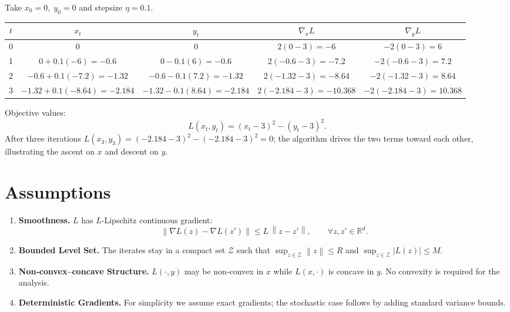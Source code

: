 \documentclass{article}
\newcommand{\norm}[1]{\left\| #1 \right\|}
\begin{document}
Take \(x_0=0,\;y_0=0\) and stepsize \(\eta=0.1\).

\begin{center}
\begin{tabular}{c|c|c|c|c}
$t$ & $x_t$ & $y_t$ & $\nabla_x L$ & $\nabla_y L$\\ \hline
0 & $0$ & $0$ & $2(0-3)=-6$ & $-2(0-3)=6$\\
1 & $0+0.1(-6)=-0.6$ & $0-0.1(6)=-0.6$ & $2(-0.6-3)=-7.2$ & $-2(-0.6-3)=7.2$\\
2 & $-0.6+0.1(-7.2)=-1.32$ & $-0.6-0.1(7.2)=-1.32$ & $2(-1.32-3)=-8.64$ & $-2(-1.32-3)=8.64$\\
3 & $-1.32+0.1(-8.64)=-2.184$ & $-1.32-0.1(8.64)=-2.184$ & $2(-2.184-3)=-10.368$ & $-2(-2.184-3)=10.368$
\end{tabular}
\end{center}
Objective values:
\[
L(x_t,y_t)=(x_t-3)^2-(y_t-3)^2.
\]
After three iterations \(L(x_3,y_3)=(-2.184-3)^2-(-2.184-3)^2=0\); the algorithm drives the two terms toward each other, illustrating the ascent on \(x\) and descent on \(y\).

\section*{Assumptions}
\begin{enumerate}[label=(A\arabic*)]
\item \textbf{Smoothness.} \(L\) has \(L\)-Lipschitz continuous gradient:
\[
\norm{\nabla L(z)-\nabla L(z')}\le L\,\norm{z-z'},\qquad
\forall z,z'\in\mathbb{R}^{d}.
\tag{A1}
\]
\item \textbf{Bounded Level Set.} The iterates stay in a compact set
\(\mathcal{Z}\) such that \(\sup_{z\in\mathcal{Z}}\norm{z}\le R\) and
\(\sup_{z\in\mathcal{Z}}|L(z)|\le M\).
\item \textbf{Non‑convex–concave Structure.} \(L(\cdot,y)\) may be non‑convex
in \(x\) while \(L(x,\cdot)\) is concave in \(y\). No convexity is required for the analysis.
\item \textbf{Deterministic Gradients.} For simplicity we assume exact gradients;
the stochastic case follows by adding standard variance bounds.
\end{enumerate}
\end{document}
